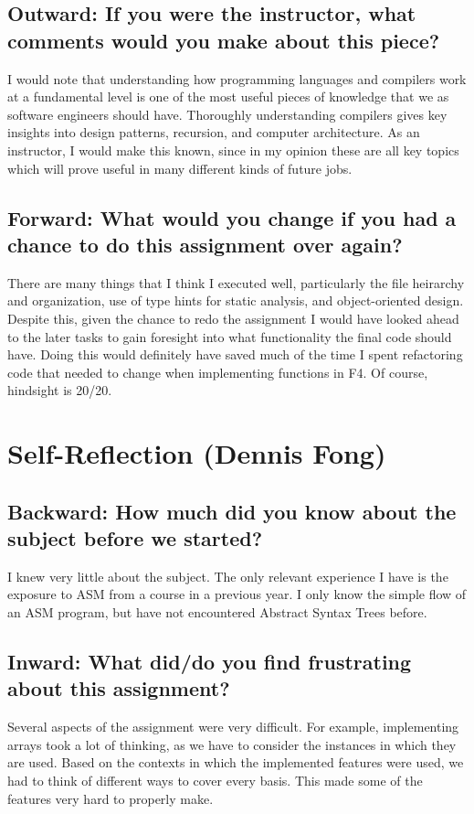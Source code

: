 \documentclass[12pt]{article}
\begin{document}
\subsection*{Outward: If you were the instructor, what comments would you make about this piece?}
I would note that understanding how programming languages and compilers work at a fundamental level is one of the most useful pieces of knowledge that we as software engineers should have. Thoroughly understanding compilers gives key insights into design patterns, recursion, and computer architecture. As an instructor, I would make this known, since in my opinion these are all key topics which will prove useful in many different kinds of future jobs.

\subsection*{Forward: What would you change if you had a chance to do this assignment over again?}
There are many things that I think I executed well, particularly the file heirarchy and organization, use of type hints for static analysis, and object-oriented design. Despite this, given the chance to redo the assignment I would have looked ahead to the later tasks to gain foresight into what functionality the final code should have. Doing this would definitely have saved much of the time I spent refactoring code that needed to change when implementing functions in F4. Of course, hindsight is 20/20.

\pagebreak

\section*{Self-Reflection (Dennis Fong)}
\subsection*{Backward: How much did you know about the subject before we started?}
I knew very little about the subject. The only relevant experience I have is the exposure to ASM from a course in a previous year. I only know the simple flow of an ASM program, but have not encountered Abstract Syntax Trees before.

\subsection*{Inward: What did/do you find frustrating about this assignment?}
Several aspects of the assignment were very difficult. For example, implementing arrays took a lot of thinking, as we have to consider the instances in which they are used. Based on the contexts in which the implemented features were used, we had to think of different ways to cover every basis. This made some of the features very hard to properly make.
\end{document}
